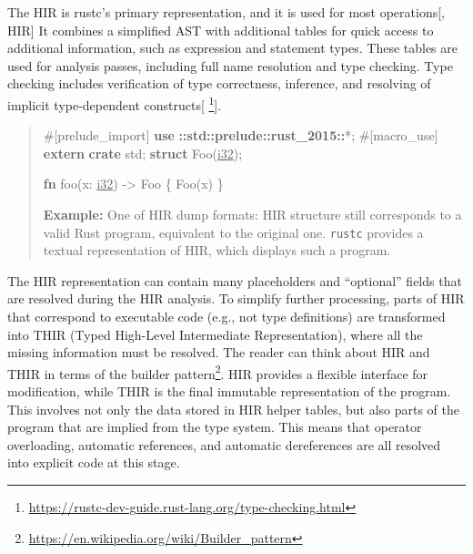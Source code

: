 \documentclass[
  11pt,
  twoside]{report}
\newenvironment{Shaded}{}{}
\newcommand{\AttributeTok}[1]{#1}
\newcommand{\DataTypeTok}[1]{\underline{#1}}
\newcommand{\KeywordTok}[1]{\textbf{#1}}
\newcommand{\NormalTok}[1]{#1}
\newcommand{\OperatorTok}[1]{#1}
\newcommand{\PreprocessorTok}[1]{\textbf{#1}}
\DeclareRobustCommand{\href}[2]{#2\footnote{\url{#1}}}
\begin{document}
The HIR is rustc's primary representation, and it is used for most
operations{[}, HIR{]} It combines a
simplified AST with additional tables for quick access to additional
information, such as expression and statement types. These tables are
used for analysis passes, including full name resolution and type
checking. Type checking includes verification of type correctness,
inference, and resolving of implicit type-dependent
constructs{[} \footnote{\url{https://rustc-dev-guide.rust-lang.org/type-checking.html}}{]}.

\begin{quote}
\begin{Shaded}
\begin{Highlighting}[]
 \AttributeTok{\#[}\NormalTok{prelude\_import}\AttributeTok{]}
 \KeywordTok{use} \PreprocessorTok{::std::prelude::rust\_2015::}\OperatorTok{*;}
 \AttributeTok{\#[}\NormalTok{macro\_use}\AttributeTok{]}
 \KeywordTok{extern} \KeywordTok{crate}\NormalTok{ std}\OperatorTok{;}
 \KeywordTok{struct}\NormalTok{ Foo(}\DataTypeTok{i32}\NormalTok{)}\OperatorTok{;}

 \KeywordTok{fn}\NormalTok{ foo(x}\OperatorTok{:} \DataTypeTok{i32}\NormalTok{) }\OperatorTok{{-}\textgreater{}}\NormalTok{ Foo }\OperatorTok{\{}\NormalTok{ Foo(x) }\OperatorTok{\}}
\end{Highlighting}
\end{Shaded}

\textbf{Example:} One of HIR dump formats: HIR structure still
corresponds to a valid Rust program, equivalent to the original one.
\texttt{rustc} provides a textual representation of HIR, which displays
such a program.
\end{quote}

The HIR representation can contain many placeholders and ``optional''
fields that are resolved during the HIR analysis. To simplify further
processing, parts of HIR that correspond to executable code (e.g., not
type definitions) are transformed into THIR (Typed High-Level
Intermediate Representation), where all the missing information must be
resolved. The reader can think about HIR and THIR in terms of the
\href{https://en.wikipedia.org/wiki/Builder_pattern}{builder pattern}.
HIR provides a flexible interface for modification, while THIR is the
final immutable representation of the program. This involves not only
the data stored in HIR helper tables, but also parts of the program that
are implied from the type system. This means that operator overloading,
automatic references, and automatic dereferences are all resolved into
explicit code at this stage.
\end{document}
